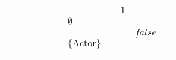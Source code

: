 \begin{table}[]
{\begin{tabular}{lllllllllll}
                          &                           &                   &                                                                          &                                                                        &                           &                                                             &                                                                            & \cellcolor[HTML]{FC8D59}$1$                                               &                                 &                                                                        \\
                          &                           &                   &                                                                          &                                                                        &                           & \cellcolor[HTML]{FC8D59}$\emptyset$                         &                                                                            &                                                                           &                                 &                                                                        \\
                          &                           &                   &                                                                          &                                                                        &                           &                                                             &                                                                            &                                                                           & \cellcolor[HTML]{FC8D59}$false$ &                                                                        \\
                          &                           &                   &                                                                          &                                                                        &                           & \cellcolor[HTML]{FC8D59}$\{\text{Actor}\}$                  &                                                                            &                                                                           &                                 &                                                                        \\
                          &                           &                   &                                                                          &                                                                        &                           &                                                             &                                                                            & \cellcolor[HTML]{FC8D59}  &                                 &                                                                        \\

\end{tabular}}
\end{table}
